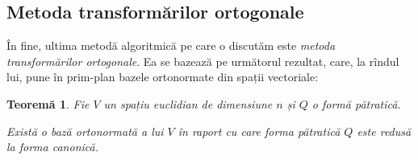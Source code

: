 \documentclass[11pt,a4paper]{article}
\theoremstyle{dotless}
\newtheorem{theorem}{Teorem\u{a}}[section]
\theoremstyle{dotlessdr}
\begin{document}

\subsection{Metoda transformărilor ortogonale}

\indent\indent În fine, ultima metodă algoritmică pe care o discutăm este
\emph{metoda transformărilor ortogonale}. Ea se bazează pe următorul rezultat, 
care, la rîndul lui, pune în prim-plan bazele ortonormate din spații vectoriale:
\begin{theorem}
	Fie $V$ un spațiu euclidian de dimensiune $n$ și $Q$ o formă pătratică.

Există o bază ortonormată a lui $V$ în raport cu care forma pătratică $Q$ este
redusă la forma canonică.
\end{theorem}
\end{document}
